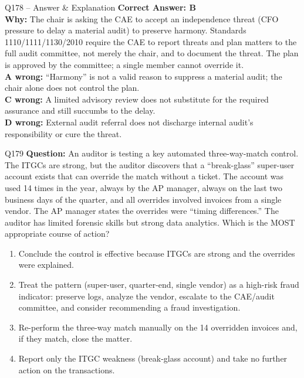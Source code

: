 \documentclass[aspectratio=169,10pt]{beamer}
\begin{document}
	\begin{frame}[t]{Q178 -- Answer \& Explanation}
		\small
		\textbf{Correct Answer: B} \\[4pt]
		\textbf{Why:} The chair is asking the CAE to accept an independence threat (CFO pressure to delay a material audit) to preserve harmony. Standards 1110/1111/1130/2010 require the CAE to report threats and plan matters to the full audit committee, not merely the chair, and to document the threat. The plan is approved by the committee; a single member cannot override it. \\[4pt]
		\textbf{A wrong:} ``Harmony'' is not a valid reason to suppress a material audit; the chair alone does not control the plan. \\[2pt]
		\textbf{C wrong:} A limited advisory review does not substitute for the required assurance and still succumbs to the delay. \\[2pt]
		\textbf{D wrong:} External audit referral does not discharge internal audit's responsibility or cure the threat.
	\end{frame}
	
	\begin{frame}[t]{Q179}
		\small
		\textbf{Question:} An auditor is testing a key automated three-way-match control. The ITGCs are strong, but the auditor discovers that a ``break-glass'' super-user account exists that can override the match without a ticket. The account was used 14 times in the year, always by the AP manager, always on the last two business days of the quarter, and all overrides involved invoices from a single vendor. The AP manager states the overrides were ``timing differences.'' The auditor has limited forensic skills but strong data analytics. Which is the MOST appropriate course of action?
		\begin{enumerate}[label=\Alph*.,itemsep=1pt,topsep=2pt]
			\item Conclude the control is effective because ITGCs are strong and the overrides were explained.
			\item Treat the pattern (super-user, quarter-end, single vendor) as a high-risk fraud indicator: preserve logs, analyze the vendor, escalate to the CAE/audit committee, and consider recommending a fraud investigation.
			\item Re-perform the three-way match manually on the 14 overridden invoices and, if they match, close the matter.
			\item Report only the ITGC weakness (break-glass account) and take no further action on the transactions.
		\end{enumerate}
	\end{frame}
	
\end{document}
